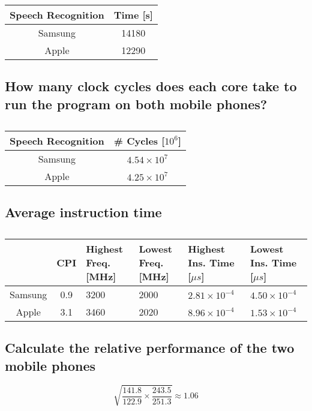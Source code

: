 \documentclass[12pt, a4paper]{article}
\begin{document}
\begin{table}[H]
\caption{}
\centering
\begin{tabular}{c|c}
Speech Recognition & Time [s] \\
\hline\hline
Samsung & 14180 \\
Apple & 12290 \\
\end{tabular}
\label{tab:8gen2}
\end{table}

\subsection{How many clock cycles does each core take to run the program on both mobile phones?}

\begin{table}[H]
\caption{}
\centering
\begin{tabular}{c|c}
Speech Recognition & \# Cycles [$10^6$] \\
\hline\hline
Samsung & $4.54\times10^7$ \\
Apple & $4.25\times10^7$ \\
\end{tabular}
\label{tab:8gen2}
\end{table}

\subsection{Average instruction time}

\begin{table}[H]
\caption{}
\centering
\begin{tabularx}{\textwidth}{c||c|X|X|X|X}
 & CPI & Highest Freq. [MHz] & Lowest Freq. [MHz] & Highest Ins. Time [$\mu s$] & Lowest Ins. Time [$\mu s$] \\
\hline\hline
Samsung & 0.9 & 3200 & 2000 & $2.81\times10^{-4}$ & $4.50\times10^{-4}$ \\
Apple & 3.1 & 3460 & 2020 & $8.96\times10^{-4}$ & $1.53\times10^{-4}$ \\
\end{tabularx}
\label{tab:8gen2}
\end{table}

\subsection{Calculate the relative performance of the two mobile phones}

$$\sqrt{\frac{141.8}{122.9}\times\frac{243.5}{251.3}}\approx1.06$$
\end{document}
